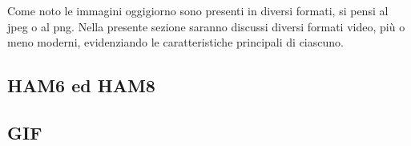 \documentclass{subfiles}
\begin{document}
Come noto le immagini oggigiorno sono presenti in diversi formati, si pensi al jpeg o al png.
Nella presente sezione saranno discussi diversi formati video, più o meno moderni, evidenziando le caratteristiche principali di ciascuno.

\subsection{HAM6 ed HAM8}

\clearpage

\subsection{GIF}

\clearpage
\end{document}
